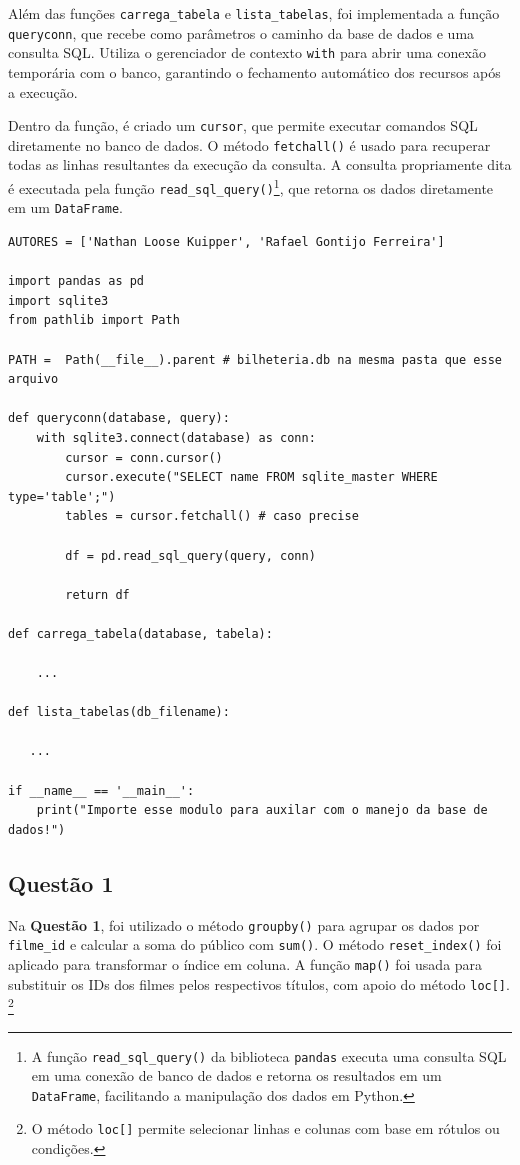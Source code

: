 \documentclass{article}
\begin{document}
Além das funções \texttt{carrega\_tabela} e \texttt{lista\_tabelas}, foi implementada a função \texttt{queryconn}, que recebe como parâmetros o caminho da base de dados e uma consulta SQL. Utiliza o gerenciador de contexto \texttt{with} para abrir uma conexão temporária com o banco, garantindo o fechamento automático dos recursos após a execução.

Dentro da função, é criado um \texttt{cursor}, que permite executar comandos SQL diretamente no banco de dados. O método \texttt{fetchall()} é usado para recuperar todas as linhas resultantes da execução da consulta. A consulta propriamente dita é executada pela função \texttt{read\_sql\_query()}\footnote{A função \texttt{read\_sql\_query()} da biblioteca \texttt{pandas} executa uma consulta SQL em uma conexão de banco de dados e retorna os resultados em um \texttt{DataFrame}, facilitando a manipulação dos dados em Python.}, que retorna os dados diretamente em um \texttt{DataFrame}.


\linespread{1}
\begin{lstlisting}
AUTORES = ['Nathan Loose Kuipper', 'Rafael Gontijo Ferreira']

import pandas as pd 
import sqlite3
from pathlib import Path

PATH =  Path(__file__).parent # bilheteria.db na mesma pasta que esse arquivo

def queryconn(database, query):
    with sqlite3.connect(database) as conn:
        cursor = conn.cursor()
        cursor.execute("SELECT name FROM sqlite_master WHERE type='table';")
        tables = cursor.fetchall() # caso precise

        df = pd.read_sql_query(query, conn)
        
        return df
    
def carrega_tabela(database, tabela):

    ...

def lista_tabelas(db_filename):

   ...
    
if __name__ == '__main__':
    print("Importe esse modulo para auxilar com o manejo da base de dados!")
\end{lstlisting}
\pagebreak
\linespread{1.5}
\subsection*{Questão 1}
Na \textbf{Questão 1}, foi utilizado o método \texttt{groupby()} para agrupar os dados por \texttt{filme\_id} e calcular a soma do público com \texttt{sum()}. O método \texttt{reset\_index()} foi aplicado para transformar o índice em coluna. A função \texttt{map()} foi usada para substituir os IDs dos filmes pelos respectivos títulos, com apoio do método \texttt{loc[]}.  \footnote{O método \texttt{loc[]} permite selecionar linhas e colunas com base em rótulos ou condições.}
\end{document}
